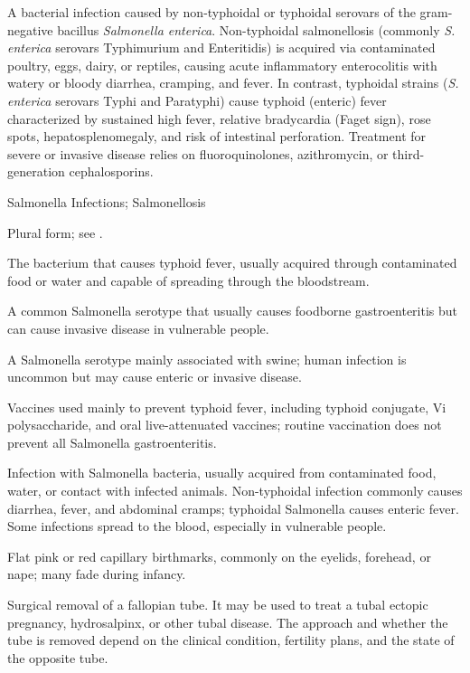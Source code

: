  A bacterial infection caused by non-typhoidal or typhoidal serovars of the gram-negative bacillus \textit{Salmonella enterica}. Non-typhoidal salmonellosis (commonly \textit{S. enterica} serovars Typhimurium and Enteritidis) is acquired via contaminated poultry, eggs, dairy, or reptiles, causing acute inflammatory enterocolitis with watery or bloody diarrhea, cramping, and fever. In contrast, typhoidal strains (\textit{S. enterica} serovars Typhi and Paratyphi) cause typhoid (enteric) fever characterized by sustained high fever, relative bradycardia (Faget sign), rose spots, hepatosplenomegaly, and risk of intestinal perforation. Treatment for severe or invasive disease relies on fluoroquinolones, azithromycin, or third-generation cephalosporins.

\synonyms
Salmonella Infections; Salmonellosis

 Plural form; see .

 The bacterium that causes typhoid fever, usually acquired through contaminated food or water and capable of spreading through the bloodstream.

 A common Salmonella serotype that usually causes foodborne gastroenteritis but can cause invasive disease in vulnerable people.

 A Salmonella serotype mainly associated with swine; human infection is uncommon but may cause enteric or invasive disease.

 Vaccines used mainly to prevent typhoid fever, including typhoid conjugate, Vi polysaccharide, and oral live-attenuated vaccines; routine vaccination does not prevent all Salmonella gastroenteritis.

 Infection with Salmonella bacteria, usually acquired from contaminated food, water, or contact with infected animals. Non-typhoidal infection commonly causes diarrhea, fever, and abdominal cramps; typhoidal Salmonella causes enteric fever. Some infections spread to the blood, especially in vulnerable people.

 Flat pink or red capillary birthmarks, commonly on the eyelids, forehead, or nape; many fade during infancy.

 Surgical removal of a fallopian tube. It may be used to treat a tubal ectopic pregnancy,
hydrosalpinx, or other tubal disease. The approach and whether the tube is removed depend
on the clinical condition, fertility plans, and the state of the opposite tube.

